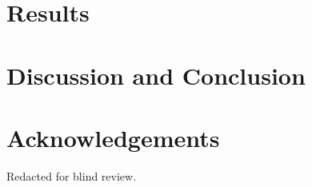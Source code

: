 \documentclass{bioinfo}
\begin{document}







\section{Results}





%
%






\section{Discussion and Conclusion}


\section*{Acknowledgements}

Redacted for blind review. \vspace*{-12pt}

\end{document}
